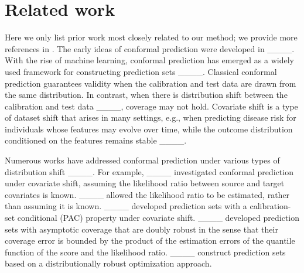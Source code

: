 \section{Related work}
Here we only list prior work most closely related to our method; we provide more references in .
The early ideas of conformal prediction were developed in ____.
With the rise of machine learning, conformal prediction has emerged as a widely used framework for constructing prediction sets ____.
Classical conformal prediction guarantees validity when the calibration and test data are drawn from the same distribution. In contrast, when there is distribution shift between the calibration and test data ____, coverage may not hold.
Covariate shift is a type of dataset shift that arises in many settings, e.g., when predicting disease risk for individuals whose features may evolve over time, while the outcome distribution conditioned on the features remains stable ____. 

Numerous works have addressed conformal prediction under various types of distribution shift 
____. For example, ____ investigated conformal prediction under covariate shift, assuming the likelihood ratio between source and target covariates is known. 
____ allowed the likelihood ratio to be estimated, rather than assuming it is known.
____ developed prediction sets with a calibration-set conditional (PAC) property under covariate shift. 
____ developed prediction sets with asymptotic coverage that are doubly robust in the sense that their coverage error is bounded by the product of the estimation errors of the quantile function of the score and the likelihood ratio.
____ construct prediction sets based on a distributionally robust optimization approach.

